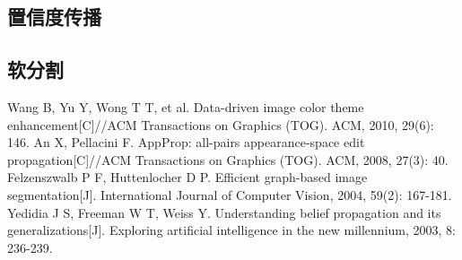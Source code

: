 \documentclass[11pt, a4paper]{article}
\begin{document}
\begin{CJK}{UTF8}{song}
\subsection{置信度传播}
\subsection{软分割}
\begin{thebibliography}{0}
     Wang B, Yu Y, Wong T T, et al. Data-driven image color theme enhancement[C]//ACM Transactions on Graphics (TOG). ACM, 2010, 29(6): 146.
	 An X, Pellacini F. AppProp: all-pairs appearance-space edit propagation[C]//ACM Transactions on Graphics (TOG). ACM, 2008, 27(3): 40.
	 Felzenszwalb P F, Huttenlocher D P. Efficient graph-based image segmentation[J]. International Journal of Computer Vision, 2004, 59(2): 167-181.
	 Yedidia J S, Freeman W T, Weiss Y. Understanding belief propagation and its generalizations[J]. Exploring artificial intelligence in the new millennium, 2003, 8: 236-239.
\end{thebibliography}
\end{CJK}
\end{document}
